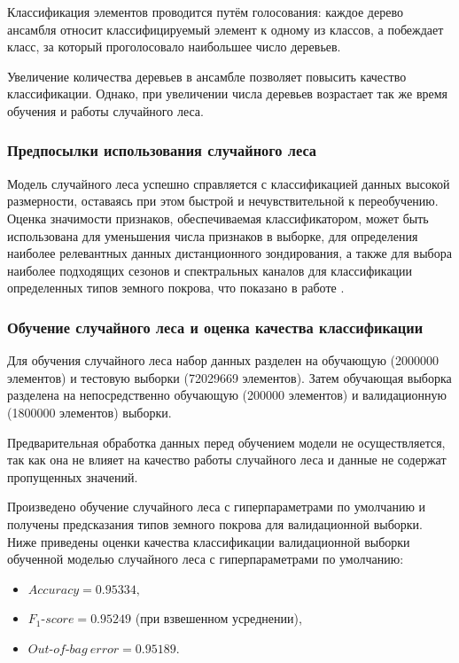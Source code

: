 \documentclass[14pt, a4paper, oneside]{extarticle}
\begin{document}
Классификация элементов проводится путём голосования: каждое дерево ансамбля относит классифицируемый элемент к одному из классов, а побеждает класс, за который проголосовало наибольшее число деревьев.

Увеличение количества деревьев в ансамбле позволяет повысить качество классификации. Однако, при увеличении числа деревьев возрастает так же время обучения и работы случайного леса.

\subsubsection{Предпосылки использования случайного леса}
Модель случайного леса успешно справляется с классификацией данных высокой размерности, оставаясь при этом быстрой и нечувствительной к переобучению. Оценка значимости признаков, обеспечиваемая классификатором, может быть использована для уменьшения числа признаков в выборке, для определения наиболее релевантных данных дистанционного зондирования, а также для выбора наиболее подходящих сезонов и спектральных каналов для классификации определенных типов земного покрова, что показано в работе \cite{random-forest-in-remote-sensing}.

\subsubsection{Обучение случайного леса и оценка качества классификации}
Для обучения случайного леса набор данных разделен на обучающую (2000000 элементов) и тестовую выборки (72029669 элементов). Затем обучающая выборка разделена на непосредственно обучающую (200000 элементов) и валидационную (1800000 элементов) выборки.

Предварительная обработка данных перед обучением модели не осуществляется, так как она не влияет на качество работы случайного леса и данные не содержат пропущенных значений.

Произведено обучение случайного леса с гиперпараметрами по умолчанию и получены предсказания типов земного покрова для валидационной выборки. Ниже приведены оценки качества классификации валидационной выборки обученной моделью случайного леса с гиперпараметрами по умолчанию:
\begin{itemize}
    \item[] $Accuracy = 0.95334,$
    \item[] $F_1\mbox{-}score = 0.95249$ (при взвешенном усреднении),
    \item[] $Out\mbox{-}of\mbox{-}bag\ error = 0.95189.$
\end{itemize}
\end{document}
